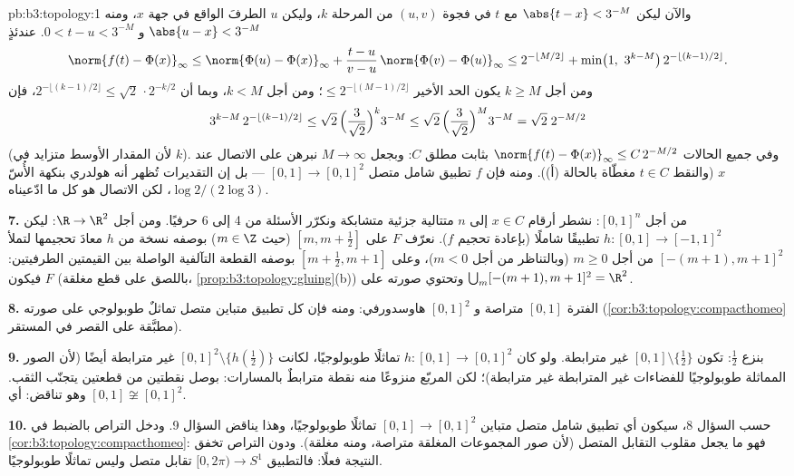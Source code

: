 \begin{solution}{pb:b3:topology:1}
والآن ليكن $\abs{t - x} < 3^{-M}$ مع $t$ في فجوة $(u, v)$ من المرحلة $k$،
وليكن $u$ الطرفَ الواقع في جهة $x$، ومنه $\abs{u - x} < 3^{-M}$ و $0 < t - u < 3^{-M}$.
عندئذٍ
\[
\norm{f(t) - \Phi(x)}_\infty
\leq \norm{\Phi(u) - \Phi(x)}_\infty
+ \frac{t - u}{v - u}\,\norm{\Phi(v) - \Phi(u)}_\infty
\leq 2^{-\lfloor M/2\rfloor} + \min\bigl(1,\ 3^{k - M}\bigr)\,
2^{-\lfloor(k-1)/2\rfloor} .
\]
ومن أجل $k \geq M$ يكون الحد الأخير $\leq 2^{-\lfloor(M-1)/2
\rfloor}$؛ ومن أجل $k < M$،
وبما أن $2^{-\lfloor(k-1)/2\rfloor} \leq
\sqrt2\,\cdot 2^{-k/2}$، فإن
\[
3^{k-M}\,2^{-\lfloor(k-1)/2\rfloor}
\leq \sqrt2\,\Bigl(\frac{3}{\sqrt2}\Bigr)^{k} 3^{-M}
\leq \sqrt2\,\Bigl(\frac{3}{\sqrt2}\Bigr)^{M} 3^{-M}
= \sqrt2\; 2^{-M/2}
\]
(لأن المقدار الأوسط متزايد في $k$). وفي جميع الحالات
$\norm{f(t) - \Phi(x)}_\infty \leq C\,2^{-M/2}$
بثابت مطلق $C$: وبجعل $M \to \infty$ نبرهن على الاتصال عند $x$
(والنقط $t \in C$ مغطّاة بالحالة (أ)). ومنه فإن $f$ تطبيق شامل
متصل $[0,1] \to [0,1]^2$ --- بل إن التقديرات تُظهر أنه هولدري بنكهة الأُسّ
$\log 2/(2\log
3)$، لكن الاتصال هو كل ما ادّعيناه.

\textbf{7.} من أجل $[0,1]^n$: نشطر أرقام $x \in C$ إلى $n$
متتالية جزئية متشابكة ونكرّر الأسئلة من 4 إلى 6 حرفيًا. ومن
أجل $\R \to \R^2$: ليكن $h \colon [0,1] \to [-1,1]^2$ تطبيقًا شاملًا  (بإعادة
تحجيم $f$). نعرّف $F$ على $[m, m
+ \frac12]$ (حيث $m \in \Z$) بوصفه نسخة
من $h$ معادَ تحجيمها لتملأ $[-(m+1), m+1]^2$ من أجل $m \geq 0$ (وبالتناظر
من أجل $m <
0$)، وعلى $[m + \frac12, m + 1]$ بوصفه القطعة التآلفية الواصلة
بين القيمتين الطرفيتين: فيكون $F$  (باللصق على قطع مغلقة،
\cref{prop:b3:topology:gluing}(b)) وتحتوي صورته على $\bigcup_m [-(m+1), m+1]^2 = \R^2$.

\textbf{8.} الفترة $[0,1]$ متراصة و $[0,1]^2$ هاوسدورفي: ومنه
فإن كل تطبيق متباين متصل تماثلٌ طوبولوجي على صورته
(\cref{cor:b3:topology:compacthomeo} مطبَّقة على القصر في المستقر).

\textbf{9.} بنزع $\frac12$: تكون $[0,1]\setminus\{\frac12\}$ غير مترابطة. ولو كان
$h \colon [0,1] \to [0,1]^2$ تماثلًا طوبولوجيًا، لكانت $[0,1]^2\setminus\{h(\frac12)\}$ غير مترابطة أيضًا
(لأن الصور المماثلة طوبولوجيًا للفضاءات غير المترابطة غير
مترابطة)؛ لكن المربّع منزوعًا منه نقطة مترابطٌ بالمسارات: بوصل
نقطتين  من قطعتين يتجنّب الثقب. وهو تناقض: أي $[0,1] \not\cong [0,1]^2$.

\textbf{10.} حسب السؤال 8، سيكون أي تطبيق شامل متصل متباين
$[0,1] \to [0,1]^2$ تماثلًا طوبولوجيًا، وهذا يناقض السؤال 9. ودخل التراص
بالضبط في \cref{cor:b3:topology:compacthomeo}: فهو ما يجعل مقلوب التقابل المتصل 
(لأن صور المجموعات المغلقة متراصة، ومنه مغلقة). ودون التراص
تخفق النتيجة فعلًا: فالتطبيق $[0, 2\pi) \to S^1$ تقابل متصل وليس تماثلًا
طوبولوجيًا.


\end{solution}
